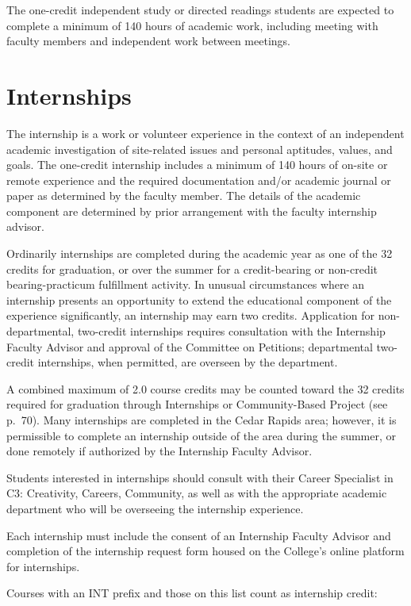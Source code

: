 \documentclass[
  letterpaper,
]{scrbook}
\begin{document}
The one-credit independent study or directed readings students are
expected to complete a minimum of 140 hours of academic work, including
meeting with faculty members and independent work between meetings.

\hypertarget{sec-internships}{%
\section{Internships}\label{sec-internships}}

The internship is a work or volunteer experience in the context of an
independent academic investigation of site-related issues and personal
aptitudes, values, and goals. The one-credit internship includes a
minimum of 140 hours of on-site or remote experience and the required
documentation and/or academic journal or paper as determined by the
faculty member. The details of the academic component are determined by
prior arrangement with the faculty internship advisor.

Ordinarily internships are completed during the academic year as one of
the 32 credits for graduation, or over the summer for a credit-bearing
or non-credit bearing-practicum fulfillment activity. In unusual
circumstances where an internship presents an opportunity to extend the
educational component of the experience significantly, an internship may
earn two credits. Application for non-departmental, two-credit
internships requires consultation with the Internship Faculty Advisor
and approval of the Committee on Petitions; departmental two-credit
internships, when permitted, are overseen by the department.

A combined maximum of 2.0 course credits may be counted toward the 32
credits required for graduation through Internships or Community-Based
Project (see p.~70). Many internships are completed in the Cedar Rapids
area; however, it is permissible to complete an internship outside of
the area during the summer, or done remotely if authorized by the
Internship Faculty Advisor.

Students interested in internships should consult with their Career
Specialist in C3: Creativity, Careers, Community, as well as with the
appropriate academic department who will be overseeing the internship
experience.

Each internship must include the consent of an Internship Faculty
Advisor and completion of the internship request form housed on the
College's online platform for internships.

Courses with an INT prefix and those on this list count as internship
credit:
\end{document}
